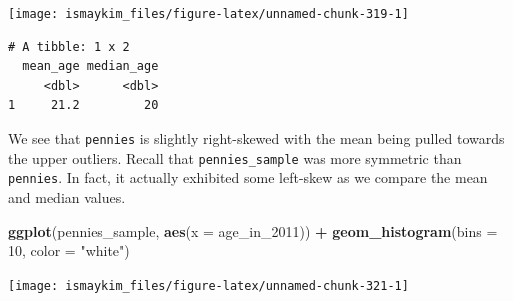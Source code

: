 \documentclass[12pt,]{krantz}
\makeatletter
\newenvironment{Shaded}{\begin{snugshade}}{\end{snugshade}}
\newcommand{\KeywordTok}[1]{\textcolor[rgb]{0.27,0.27,0.27}{\textbf{#1}}}
\newcommand{\DataTypeTok}[1]{\textcolor[rgb]{0.27,0.27,0.27}{#1}}
\newcommand{\DecValTok}[1]{\textcolor[rgb]{0.06,0.06,0.06}{#1}}
\newcommand{\StringTok}[1]{\textcolor[rgb]{0.5,0.5,0.5}{#1}}
\newcommand{\OperatorTok}[1]{\textcolor[rgb]{0.43,0.43,0.43}{\textbf{#1}}}
\newcommand{\NormalTok}[1]{#1}
\newenvironment{kframe}{%
\medskip{}
\setlength{\fboxsep}{.8em}
 \def\at@end@of@kframe{}%
 \ifinner\ifhmode%
  \def\at@end@of@kframe{\end{minipage}}%
  \begin{minipage}{\columnwidth}%
 \fi\fi%
 \def\FrameCommand##1{\hskip\@totalleftmargin \hskip-\fboxsep
 \colorbox{shadecolor}{##1}\hskip-\fboxsep
     \hskip-\linewidth \hskip-\@totalleftmargin \hskip\columnwidth}%
 \MakeFramed {\advance\hsize-\width
   \@totalleftmargin\z@ \linewidth\hsize
   \@setminipage}}%
 {\par\unskip\endMakeFramed%
 \at@end@of@kframe}
\renewenvironment{Shaded}{\begin{kframe}}{\end{kframe}}
\theoremstyle{definition}
\theoremstyle{definition}
\theoremstyle{definition}
\theoremstyle{remark}
\makeatother
\begin{document}
\begin{center}\texttt{[image: ismaykim\_files/figure-latex/unnamed-chunk-319-1]} \end{center}

\begin{Shaded}
\end{Shaded}

\begin{verbatim}
# A tibble: 1 x 2
  mean_age median_age
     <dbl>      <dbl>
1     21.2         20
\end{verbatim}

We see that \texttt{pennies} is slightly right-skewed with the mean
being pulled towards the upper outliers. Recall that
\texttt{pennies\_sample} was more symmetric than \texttt{pennies}. In
fact, it actually exhibited some left-skew as we compare the mean and
median values.

\begin{Shaded}
\begin{Highlighting}[]
\KeywordTok{ggplot}\NormalTok{(pennies_sample, }\KeywordTok{aes}\NormalTok{(}\DataTypeTok{x =}\NormalTok{ age_in_}\DecValTok{2011}\NormalTok{)) }\OperatorTok{+}
\StringTok{  }\KeywordTok{geom_histogram}\NormalTok{(}\DataTypeTok{bins =} \DecValTok{10}\NormalTok{, }\DataTypeTok{color =} \StringTok{"white"}\NormalTok{)}
\end{Highlighting}
\end{Shaded}

\begin{center}\texttt{[image: ismaykim\_files/figure-latex/unnamed-chunk-321-1]} \end{center}

\begin{Shaded}
\end{Shaded}
\end{document}

